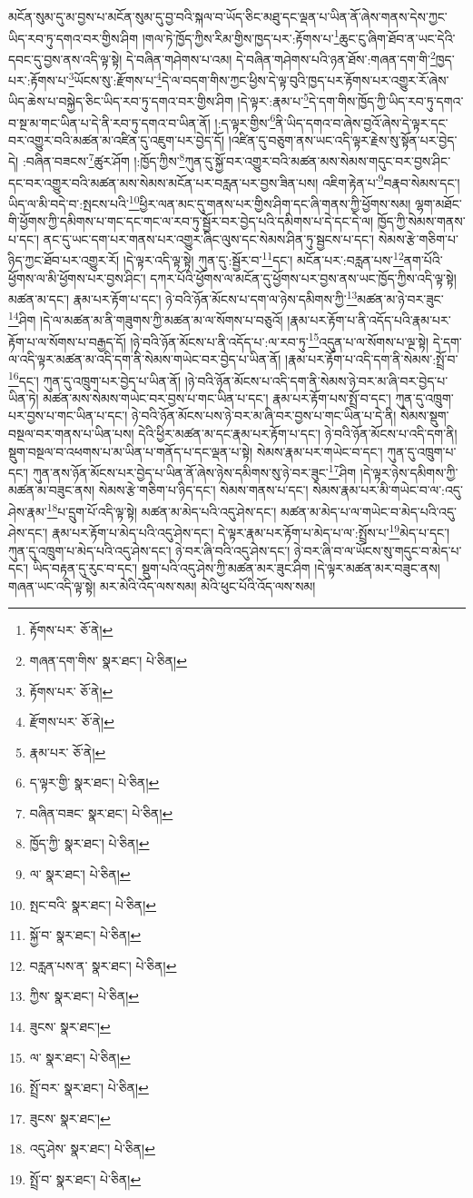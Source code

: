 མངོན་སུམ་དུ་མ་བྱས་པ་མངོན་སུམ་དུ་བྱ་བའི་སྐལ་བ་ཡོད་ཅིང་མཐུ་དང་ལྡན་པ་ཡིན་ནོ་ཞེས་གནས་དེས་ཀྱང་ཡིད་རབ་ཏུ་དགའ་བར་གྱིས་ཤིག །གལ་ཏེ་ཁྱོད་ཀྱིས་རིམ་གྱིས་ཁྱད་པར་:རྟོགས་པ་\footnote{རྟོགས་པར་  ཅོ་ནེ། }ཆུང་ངུ་ཞིག་ཐོབ་ན་ཡང་དེའི་དབང་དུ་བྱས་ནས་འདི་ལྟ་སྟེ། དེ་བཞིན་གཤེགས་པ་འམ། དེ་བཞིན་གཤེགས་པའི་ཉན་ཐོས་:གཞན་དག་གི་\footnote{གཞན་དག་གིས་  སྣར་ཐང་།  པེ་ཅིན། }ཁྱད་པར་:རྟོགས་པ་\footnote{རྟོགས་པར་  ཅོ་ནེ། }ཡོངས་སུ་:རྫོགས་པ་\footnote{རྫོགས་པར་  ཅོ་ནེ། }དེ་ལ་བདག་གིས་ཀྱང་ཕྱིས་དེ་ལྟ་བུའི་ཁྱད་པར་རྟོགས་པར་འགྱུར་རོ་ཞེས་ཡིད་ཆེས་པ་བསྐྱེད་ཅིང་ཡིད་རབ་ཏུ་དགའ་བར་གྱིས་ཤིག །དེ་ལྟར་:རྣམ་པ་\footnote{རྣམ་པར་  ཅོ་ནེ། }དེ་དག་གིས་ཁྱོད་ཀྱི་ཡིད་རབ་ཏུ་དགའ་བ་སྔ་མ་གང་ཡིན་པ་དེ་ནི་རབ་ཏུ་དགའ་བ་ཡིན་ནོ། །:ད་ལྟར་གྱིས་\footnote{ད་ལྟར་གྱི་  སྣར་ཐང་།  པེ་ཅིན། }ནི་ཡིད་དགའ་བ་ཞེས་བྱའོ་ཞེས་དེ་ལྟར་དང་བར་འགྱུར་བའི་མཚན་མ་འཛིན་དུ་འཇུག་པར་བྱེད་དོ། །འཛིན་དུ་བཅུག་ནས་ཡང་འདི་ལྟར་རྗེས་སུ་སྟོན་པར་བྱེད་དེ། :བཞིན་བཟངས་\footnote{བཞིན་བཟང་  སྣར་ཐང་།  པེ་ཅིན། }ཚུར་ཤོག །:ཁྱོད་ཀྱིས་\footnote{ཁྱོད་ཀྱི་  སྣར་ཐང་།  པེ་ཅིན། }ཀུན་དུ་སྐྱོ་བར་འགྱུར་བའི་མཚན་མས་སེམས་གདུང་བར་བྱས་ཤིང་དང་བར་འགྱུར་བའི་མཚན་མས་སེམས་མངོན་པར་བརླན་པར་བྱས་ཟིན་པས། འཇིག་རྟེན་པ་\footnote{ལ་  སྣར་ཐང་།  པེ་ཅིན། }བརྣབ་སེམས་དང་། ཡིད་ལ་མི་བདེ་བ་:སྤངས་པའི་\footnote{སྤང་བའི་  སྣར་ཐང་།  པེ་ཅིན། }ཕྱིར་ལན་མང་དུ་གནས་པར་གྱིས་ཤིག་དང་ཞི་གནས་ཀྱི་ཕྱོགས་སམ། ལྷག་མཐོང་གི་ཕྱོགས་ཀྱི་དམིགས་པ་གང་དང་གང་ལ་རབ་ཏུ་སྦྱོར་བར་བྱེད་པའི་དམིགས་པ་དེ་དང་དེ་ལ། ཁྱོད་ཀྱི་སེམས་གནས་པ་དང་། ནང་དུ་ཡང་དག་པར་གནས་པར་འགྱུར་ཞིང་ལུས་དང་སེམས་ཤིན་ཏུ་སྦྱངས་པ་དང་། སེམས་རྩེ་གཅིག་པ་ཉིད་ཀྱང་ཐོབ་པར་འགྱུར་རོ། །དེ་ལྟར་འདི་ལྟ་སྟེ། ཀུན་དུ་:སྦྱོར་བ་\footnote{སྐྱོ་བ་  སྣར་ཐང་།  པེ་ཅིན། }དང་། མངོན་པར་:བརླན་པས་\footnote{བརླན་པས་ན་  སྣར་ཐང་།  པེ་ཅིན། }ནག་པོའི་ཕྱོགས་ལ་མི་ཕྱོགས་པར་བྱས་ཤིང་། དཀར་པོའི་ཕྱོགས་ལ་མངོན་དུ་ཕྱོགས་པར་བྱས་ནས་ཡང་ཁྱོད་ཀྱིས་འདི་ལྟ་སྟེ། མཚན་མ་དང་། རྣམ་པར་རྟོག་པ་དང་། ཉེ་བའི་ཉོན་མོངས་པ་དག་ལ་ཉེས་དམིགས་ཀྱི་\footnote{ཀྱིས་  སྣར་ཐང་།  པེ་ཅིན། }མཚན་མ་ཉེ་བར་ཟུང་\footnote{ཟུངས་  སྣར་ཐང་། }ཤིག །དེ་ལ་མཚན་མ་ནི་གཟུགས་ཀྱི་མཚན་མ་ལ་སོགས་པ་བཅུའོ། །རྣམ་པར་རྟོག་པ་ནི་འདོད་པའི་རྣམ་པར་རྟོག་པ་ལ་སོགས་པ་བརྒྱད་དོ། །ཉེ་བའི་ཉོན་མོངས་པ་ནི་འདོད་པ་:ལ་རབ་ཏུ་\footnote{ལ་  སྣར་ཐང་།  པེ་ཅིན། }འདུན་པ་ལ་སོགས་པ་ལྔ་སྟེ། དེ་དག་ལ་འདི་ལྟར་མཚན་མ་འདི་དག་ནི་སེམས་གཡེང་བར་བྱེད་པ་ཡིན་ནོ། །རྣམ་པར་རྟོག་པ་འདི་དག་ནི་སེམས་:སྤྲོ་བ་\footnote{སྤྲོ་བར་  སྣར་ཐང་།  པེ་ཅིན། }དང་། ཀུན་དུ་འཁྲུག་པར་བྱེད་པ་ཡིན་ནོ། །ཉེ་བའི་ཉོན་མོངས་པ་འདི་དག་ནི་སེམས་ཉེ་བར་མ་ཞི་བར་བྱེད་པ་ཡིན་ཏེ། མཚན་མས་སེམས་གཡེང་བར་བྱས་པ་གང་ཡིན་པ་དང་། རྣམ་པར་རྟོག་པས་སྤྲོ་བ་དང་། ཀུན་དུ་འཁྲུག་པར་བྱས་པ་གང་ཡིན་པ་དང་། ཉེ་བའི་ཉོན་མོངས་པས་ཉེ་བར་མ་ཞི་བར་བྱས་པ་གང་ཡིན་པ་དེ་ནི། སེམས་སྡུག་བསྔལ་བར་གནས་པ་ཡིན་པས། དེའི་ཕྱིར་མཚན་མ་དང་རྣམ་པར་རྟོག་པ་དང་། ཉེ་བའི་ཉོན་མོངས་པ་འདི་དག་ནི། སྡུག་བསྔལ་བ་འཕགས་པ་མ་ཡིན་པ་གནོད་པ་དང་ལྡན་པ་སྟེ། སེམས་རྣམ་པར་གཡེང་བ་དང་། ཀུན་དུ་འཁྲུག་པ་དང་། ཀུན་ནས་ཉོན་མོངས་པར་བྱེད་པ་ཡིན་ནོ་ཞེས་ཉེས་དམིགས་སུ་ཉེ་བར་ཟུང་\footnote{ཟུངས་  སྣར་ཐང་། }ཤིག །དེ་ལྟར་ཉེས་དམིགས་ཀྱི་མཚན་མ་བཟུང་ནས། སེམས་རྩེ་གཅིག་པ་ཉིད་དང་། སེམས་གནས་པ་དང་། སེམས་རྣམ་པར་མི་གཡེང་བ་ལ་:འདུ་ཤེས་རྣམ་\footnote{འདུ་ཤེས་  སྣར་ཐང་།  པེ་ཅིན། }པ་དྲུག་པོ་འདི་ལྟ་སྟེ། མཚན་མ་མེད་པའི་འདུ་ཤེས་དང་། མཚན་མ་མེད་པ་ལ་གཡེང་བ་མེད་པའི་འདུ་ཤེས་དང་། རྣམ་པར་རྟོག་པ་མེད་པའི་འདུ་ཤེས་དང་། དེ་ལྟར་རྣམ་པར་རྟོག་པ་མེད་པ་ལ་:སྤྲོས་པ་\footnote{སྤྲོ་བ་  སྣར་ཐང་།  པེ་ཅིན། }མེད་པ་དང་། ཀུན་དུ་འཁྲུག་པ་མེད་པའི་འདུ་ཤེས་དང་། ཉེ་བར་ཞི་བའི་འདུ་ཤེས་དང་། ཉེ་བར་ཞི་བ་ལ་ཡོངས་སུ་གདུང་བ་མེད་པ་དང་། ཡིད་བརྟན་དུ་རུང་བ་དང་། སྡུག་པའི་འདུ་ཤེས་ཀྱི་མཚན་མར་ཟུང་ཤིག །དེ་ལྟར་མཚན་མར་བཟུང་ནས། གཞན་ཡང་འདི་ལྟ་སྟེ། མར་མེའི་འོད་ལས་སམ། མེའི་ཕུང་པོའི་འོད་ལས་སམ། 